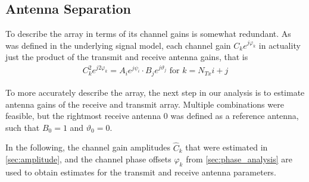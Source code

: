 \subsection{Antenna Separation}
To describe the array in terms of its channel gains is somewhat redundant.
As was defined in the underlying signal model, each channel gain $C_ke^{j\varphi_k}$ in actuality
just the product of the transmit and receive antenna gains, that is
\begin{align}
  C_k^2e^{j2\varphi_k} = A_i e^{j\psi_i} \cdot B_j e^{j\vartheta_j} \text{ for } k=N_{Tx}i+j
\end{align}

To more accurately describe the array,
the next step in our analysis is to estimate antenna gains of the receive and transmit array.
Multiple combinations were feasible, but the rightmost receive antenna 0 was defined as a reference antenna,
such that $B_0=1$ and $\vartheta_0 = 0$.

In the following, the channel gain amplitudes $\hat C_k$ that were estimated in \cref{sec:amplitude},
and the channel phase offsets $\hat \varphi_k$ from \cref{sec:phase_analysis}
are used to obtain estimates for the transmit and receive antenna parameters. \\

